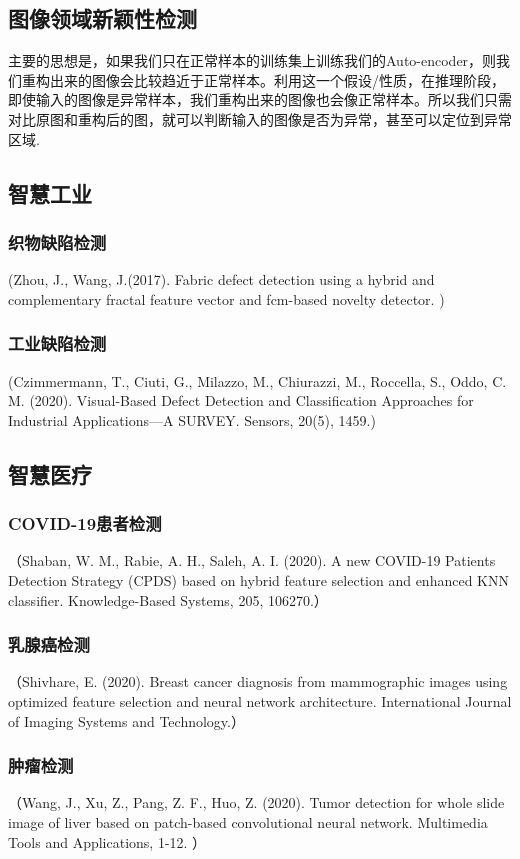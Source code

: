 \documentclass{Style/aas}
\begin{document}
\begin{multicols}{2}
  \section{图像领域新颖性检测}
  主要的思想是，如果我们只在正常样本的训练集上训练我们的Auto-encoder，则我们重构出来的图像会比较趋近于正常样本。利用这一个假设/性质，在推理阶段，即使输入的图像是异常样本，我们重构出来的图像也会像正常样本。所以我们只需对比原图和重构后的图，就可以判断输入的图像是否为异常，甚至可以定位到异常区域.

  \subsection{智慧工业}
  \subsubsection{织物缺陷检测}
  (Zhou, J., Wang, J.(2017). Fabric defect detection using a hybrid and complementary fractal feature vector and fcm-based novelty detector. )

  \subsubsection{工业缺陷检测}
  (Czimmermann, T., Ciuti, G., Milazzo, M., Chiurazzi, M., Roccella, S., Oddo, C. M. (2020). Visual-Based Defect Detection and Classification Approaches for Industrial Applications—A SURVEY. Sensors, 20(5), 1459.)

  \subsection{智慧医疗}
  \subsubsection{COVID-19患者检测}
  （Shaban, W. M., Rabie, A. H., Saleh, A. I. (2020). A new COVID-19 Patients Detection Strategy (CPDS) based on hybrid feature selection and enhanced KNN classifier. Knowledge-Based Systems, 205, 106270.）

  \subsubsection{乳腺癌检测}
  （Shivhare, E. (2020). Breast cancer diagnosis from mammographic images using optimized feature selection and neural network architecture. International Journal of Imaging Systems and Technology.）

  \subsubsection{肿瘤检测}
  （Wang, J., Xu, Z., Pang, Z. F., Huo, Z. (2020). Tumor detection for whole slide image of liver based on patch-based convolutional neural network. Multimedia Tools and Applications, 1-12. ）


\end{multicols}
\end{document}
